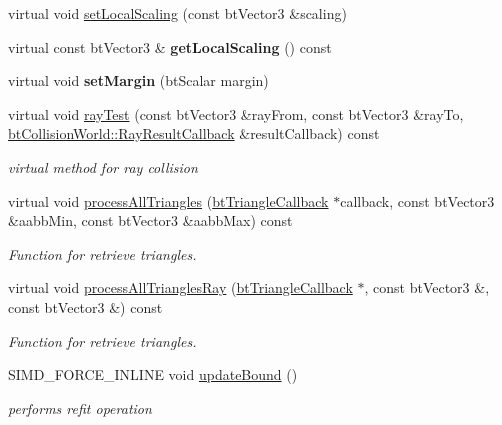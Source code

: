 \begin{DoxyCompactItemize}
virtual void \hyperlink{classbtGImpactShapeInterface_adec0bd43cd0105b1d0dc172bc7db50d8}{set\+Local\+Scaling} (const bt\+Vector3 \&scaling)
\item 
\mbox{\label{classbtGImpactShapeInterface_a702ea8c697ccf8c454e0b488dd0bf3f2}} 
virtual const bt\+Vector3 \& {\bfseries get\+Local\+Scaling} () const
\item 
\mbox{\label{classbtGImpactShapeInterface_a2732455f7b2cdb44c41481d9d9ebd548}} 
virtual void {\bfseries set\+Margin} (bt\+Scalar margin)
\item 
\mbox{\label{classbtGImpactShapeInterface_afed230ba546b551d8c9b585d227f8d5e}} 
virtual void \hyperlink{classbtGImpactShapeInterface_afed230ba546b551d8c9b585d227f8d5e}{ray\+Test} (const bt\+Vector3 \&ray\+From, const bt\+Vector3 \&ray\+To, \hyperlink{structbtCollisionWorld_1_1RayResultCallback}{bt\+Collision\+World\+::\+Ray\+Result\+Callback} \&result\+Callback) const
\begin{DoxyCompactList}\small\item\em virtual method for ray collision \end{DoxyCompactList}\item 
virtual void \hyperlink{classbtGImpactShapeInterface_ae1dc14b29f49fc0262be72dbe9d7b75b}{process\+All\+Triangles} (\hyperlink{classbtTriangleCallback}{bt\+Triangle\+Callback} $\ast$callback, const bt\+Vector3 \&aabb\+Min, const bt\+Vector3 \&aabb\+Max) const
\begin{DoxyCompactList}\small\item\em Function for retrieve triangles. \end{DoxyCompactList}\item 
virtual void \hyperlink{classbtGImpactShapeInterface_af67273183582c6696169ee4ae5d6cf37}{process\+All\+Triangles\+Ray} (\hyperlink{classbtTriangleCallback}{bt\+Triangle\+Callback} $\ast$, const bt\+Vector3 \&, const bt\+Vector3 \&) const
\begin{DoxyCompactList}\small\item\em Function for retrieve triangles. \end{DoxyCompactList}\item 
S\+I\+M\+D\+\_\+\+F\+O\+R\+C\+E\+\_\+\+I\+N\+L\+I\+NE void \hyperlink{classbtGImpactShapeInterface_acb26c2d7a2aecabd06b996b72b848492}{update\+Bound} ()
\begin{DoxyCompactList}\small\item\em performs refit operation \end{DoxyCompactList}\item 

\end{DoxyCompactItemize}
